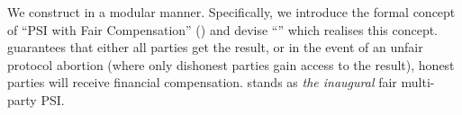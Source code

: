 








We construct \withRew in a modular manner. Specifically, we introduce the formal concept of ``PSI with Fair Compensation'' (\p) and devise  ``\withFai'' which realises this concept. 
%
%
 \p guarantees that either all parties get the result, or in the event of an unfair protocol abortion (where only dishonest parties gain access to the result), honest parties will receive financial compensation. \withFai stands as \textit{the inaugural} fair multi-party PSI.
 
 



